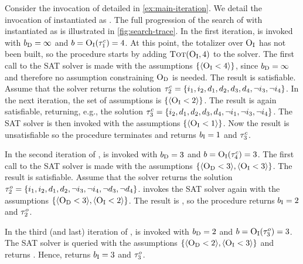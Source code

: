 \begin{example}\label{ex:satunsat}
  Consider the invocation of \algname{} detailed in \cref{ex:main-iteration}. 
  We detail the invocation of \Min{} instantiated as \satunsat{}. 
  The full progression of the search of \algname{} with \Min{} instantiated as \satunsat{} is illustrated in \cref{fig:search-trace}.
  In the first iteration, \satunsat{} is invoked with $b_{\text{D}} = \infty$ and $b=\textsc{O}_{\text{I}}(\tau^c_1) = 4$.
  At this point, the totalizer over $\textsc{O}_{\text{I}}$ has not been built, so the procedure starts by adding $\textsc{Tot}(\textsc{O}_{\text{I}}, 4)$ to the solver.
  The first call to the SAT solver is made with the assumptions $\{\langle \textsc{O}_{\text{I}} < 4 \rangle\}$, since $b_{\text{D}} = \infty$ and therefore no assumption constraining $\textsc{O}_{\text{D}}$ is needed.
  The result is satisfiable.
  Assume that the solver returns the solution $\tau^c_2 = \{i_1,\allowbreak i_2,\allowbreak d_1,\allowbreak d_2,\allowbreak d_3,\allowbreak d_4,\allowbreak \lnot i_3,\allowbreak \lnot i_4\}$. 
  In the next iteration, the set of assumptions is $\{\langle \textsc{O}_{\text{I}} < 2 \rangle\}$.
  The result is again satisfiable, returning, e.g., the solution $\tau^c_3 = \{i_2,\allowbreak d_1,\allowbreak d_2,\allowbreak d_3,\allowbreak d_4,\allowbreak \lnot i_1,\allowbreak \lnot i_3,\allowbreak \lnot i_4\}$.
  The SAT solver is then invoked with the assumptions $\{\langle \textsc{O}_{\text{I}} < 1 \rangle\}$.
  Now the result is unsatisfiable so the procedure terminates and returns $b_{\text{I}} = 1$ and $\tau^c_3$.

  In the second iteration of \algname{}, \satunsat{} is invoked with $b_{\text{D}} = 3$ and $b=\textsc{O}_{\text{I}}(\tau^c_4) = 3$.
  The first call to the SAT solver is made with the assumptions $\{ \langle \textsc{O}_{\text{D}} < 3 \rangle, \langle \textsc{O}_{\text{I}} < 3 \rangle \}$.
  The result is satisfiable.
  Assume that the solver returns the solution $\tau^o_2 = \{i_1,\allowbreak i_2,\allowbreak d_1,\allowbreak d_2,\allowbreak \lnot i_3,\allowbreak \lnot i_4,\allowbreak \lnot d_3,\allowbreak \lnot d_4\}$.
  \satunsat{} invokes the SAT solver again with the assumptions $\{ \langle \textsc{O}_{\text{D}} < 3 \rangle, \langle \textsc{O}_{\text{I}} < 2 \rangle \}$.
  The result is \unsat{}, so the procedure returns $b_{\text{I}} = 2$ and $\tau^o_2$.

  In the third (and last) iteration of \algname{}, \satunsat{} is invoked with $b_{\text{D}} = 2$ and $b=\textsc{O}_{\text{I}}(\tau^o_3) = 3$.
  The SAT solver is queried with the assumptions $\{ \langle \textsc{O}_{\text{D}} < 2 \rangle, \langle \textsc{O}_{\text{I}} < 3 \rangle \}$ and returns \unsat{}.
  Hence, \satunsat{} returns $b_{\text{I}} = 3$ and $\tau^o_3$.
\end{example}

\subsection{\unsatsat{}\label{sec:unsat-sat}}


